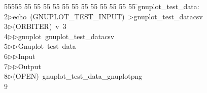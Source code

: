 %
%
\begin{tabbing}
55555 \= 55 \= 55 \= 55 \= 55 \= 55 \= 55 \= 55 \= 55 \= 55 \= 55 \= 55 \= 55 \= \>gnuplot\_test\_data:\\[0pt]
2\>$\triangleright$\>echo\ (GNUPLOT\_TEST\_INPUT)\ {\textgreater}gnuplot\_test\_datacsv\\[0pt]
3\>$\triangleright$\>(ORBITER)\ v\ 3\ \\[0pt]
4\>$\triangleright$\>$\triangleright$\>gnuplot\ gnuplot\_test\_datacsv\ \\[0pt]
5\>$\triangleright$\>$\triangleright$\>Gnuplot\ test\ data\ \\[0pt]
6\>$\triangleright$\>$\triangleright$\>Input\ \\[0pt]
7\>$\triangleright$\>$\triangleright$\>Output\\[0pt]
8\>$\triangleright$\>(OPEN)\ gnuplot\_test\_data\_gnuplotpng\\[0pt]
9\>\end{tabbing}
